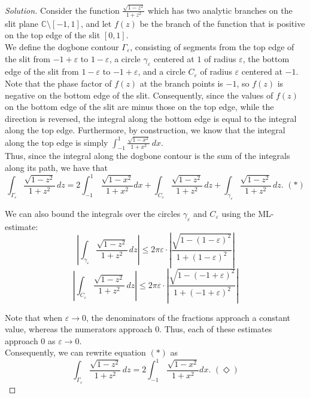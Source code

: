 \documentclass[11pt]{article}
\newenvironment{solution}
  {\renewcommand\qedsymbol{$\blacksquare$}\begin{proof}[Solution]}
  {\end{proof}}
\theoremstyle{definition}
\begin{document}
\begin{solution}
Consider the function $\frac{\sqrt{1-z^2}}{1+z^2}$ which has two analytic branches on the slit plane $\mathbb{C} \setminus [-1, 1]$, and let $f(z)$ be the branch of the function that is positive on the top edge of the slit $[0, 1]$. \\

We define the dogbone contour $\Gamma_\varepsilon$, consisting of segments from the top edge of the slit from $ -1 + \varepsilon$ to $1-\varepsilon$, a circle $\gamma_\varepsilon$ centered at $1$ of radius $\varepsilon$,
the bottom edge of the slit from $1-\varepsilon$ to $-1+\varepsilon$, and a circle $C_{\varepsilon}$ of radius $\varepsilon$ centered at $-1$. \\

Note that the phase factor of $f(z)$ at the branch points is $-1$, so $f(z)$ is negative on the bottom edge of the slit. Consequently, since the values of $f(z)$ on the bottom edge of the slit are minus those on the top edge, while the direction is reversed,
the integral along the bottom edge is equal to the integral along the top edge. Furthermore, by construction, we know that the integral along the top edge is simply $\int_{-1}^1 \frac{\sqrt{1-x^2}}{1+x^2} \, dx.$ \\

Thus, since the integral along the dogbone contour is the sum of the integrals along its path, we have that
\[ \int_{\Gamma_\varepsilon} \frac{\sqrt{1-z^2}}{1+z^2} \, dz = 2\int_{-1}^1 \, \frac{\sqrt{1-x^2}}{1+x^2} dx + \int_{C_\varepsilon} \frac{\sqrt{1-z^2}}{1+z^2} \, dz + \int_{\gamma_{\varepsilon}} \frac{\sqrt{1-z^2}}{1+z^2} \, dz. \, \, (\ast)\]

We can also bound the integrals over the circles $\gamma_{\varepsilon}$ and $C_{\varepsilon}$ using the ML-estimate:
\[ \left| \int_{\gamma_{\varepsilon}} \frac{\sqrt{1-z^2}}{1+z^2} \, dz \right| \leq 2\pi\varepsilon \cdot \left| \frac{\sqrt{1 - (1 - \varepsilon)^2}}{1 + (1-\varepsilon)^2 }\right| \]
\[ \left| \int_{C_{\varepsilon}} \frac{\sqrt{1-z^2}}{1+z^2} \, dz \right| \leq 2\pi\varepsilon \cdot \left| \frac{\sqrt{1 - (-1 + \varepsilon)^2}}{1 + (-1+\varepsilon)^2 }\right| \]

Note that when $\varepsilon \rightarrow 0$, the denominators of the fractions approach a constant value, whereas the numerators approach $0$. Thus, each of these estimates approach $0$ as $\varepsilon \rightarrow 0$. \\

Consequently, we can rewrite equation $(\ast)$ as
\[ \int_{\Gamma_\varepsilon} \frac{\sqrt{1-z^2}}{1+z^2} \, dz = 2\int_{-1}^1 \, \frac{\sqrt{1-x^2}}{1+x^2} dx. \, \, (\Diamond) \]


\end{solution}
\end{document}
